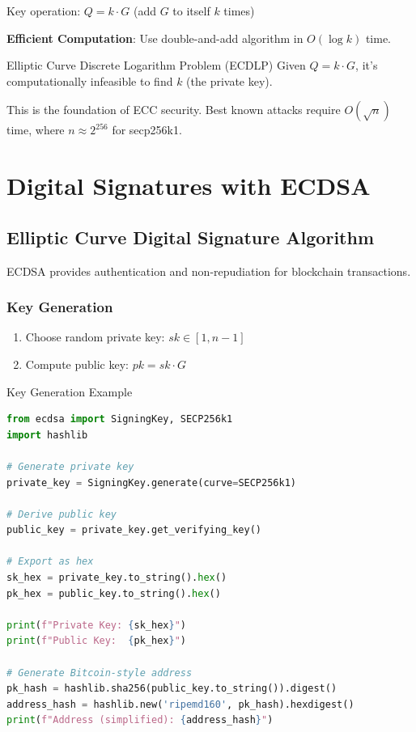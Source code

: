 \documentclass[11pt,a4paper]{article}
\begin{document}
Key operation: $Q = k \cdot G$ (add $G$ to itself $k$ times)

\textbf{Efficient Computation}: Use double-and-add algorithm in $O(\log k)$ time.

\begin{keybox}{Elliptic Curve Discrete Logarithm Problem (ECDLP)}
Given $Q = k \cdot G$, it's computationally infeasible to find $k$ (the private key).

This is the foundation of ECC security. Best known attacks require $O(\sqrt{n})$ time, where $n \approx 2^{256}$ for secp256k1.
\end{keybox}

\section{Digital Signatures with ECDSA}

\subsection{Elliptic Curve Digital Signature Algorithm}

ECDSA provides authentication and non-repudiation for blockchain transactions.

\subsubsection{Key Generation}

\begin{enumerate}
  \item Choose random private key: $sk \in [1, n-1]$
  \item Compute public key: $pk = sk \cdot G$
\end{enumerate}

\begin{examplebox}{Key Generation Example}
\begin{lstlisting}[language=Python]
from ecdsa import SigningKey, SECP256k1
import hashlib

# Generate private key
private_key = SigningKey.generate(curve=SECP256k1)

# Derive public key
public_key = private_key.get_verifying_key()

# Export as hex
sk_hex = private_key.to_string().hex()
pk_hex = public_key.to_string().hex()

print(f"Private Key: {sk_hex}")
print(f"Public Key:  {pk_hex}")

# Generate Bitcoin-style address
pk_hash = hashlib.sha256(public_key.to_string()).digest()
address_hash = hashlib.new('ripemd160', pk_hash).hexdigest()
print(f"Address (simplified): {address_hash}")
\end{lstlisting}
\end{examplebox}
\end{document}
